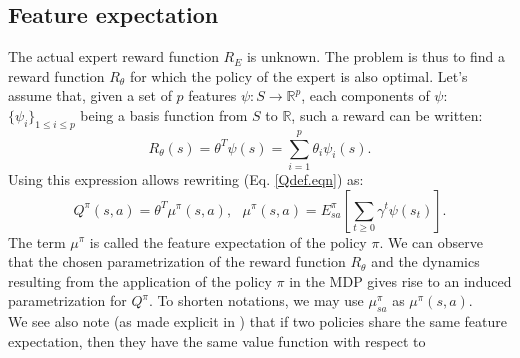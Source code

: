 \documentclass[tablecaption=bottom]{jmlr}
\begin{document}
\subsection{Feature expectation}
\label{ConsiderationsTechniques.sec}
The actual expert reward function $R_E$ is unknown. The problem is
 thus to find a reward function $R_\theta$ for which the policy of
the expert is also optimal. Let's assume that, given a set of $p$
features $\psi: S\rightarrow \mathbb{R}^p$, each components of
$\psi$: $\{\psi_i\}_{1\leq i \leq p}$ being a basis function from
$S$ to $\mathbb{R}$, such a reward can be written:
\begin{equation}
\label{hatRdef.eqn} %
R_\theta(s) = \theta^T\psi(s) =
\sum_{i=1}^p\theta_i\psi_i(s).
\end{equation}
Using this expression allows rewriting (Eq. \eqref{Qdef.eqn}) as:
\begin{equation}
Q^\pi(s,a)=\theta^T\mu^\pi(s,a),\text{ }\mu^\pi(s,a) =
E^\pi_{sa}[\sum_{t\geq 0}\gamma^t\psi(s_t)]. \label{Qmu.eqn}
\end{equation}
%
The term $\mu^\pi$ is called the feature expectation of the policy
$\pi$. We can observe that the chosen parametrization of the reward
function $R_\theta$ and the dynamics resulting from the application
of the policy $\pi$ in the MDP gives rise to an induced
parametrization for $Q^\pi$. To
shorten notations, we may use $\mu^\pi_{sa}$ as $\mu^\pi(s,a)$.\\
%
We see also note (as made explicit in \cite{abbeel2004apprenticeship}) that if two policies share the same feature
expectation, then they have the same value function with respect to
\end{document}
